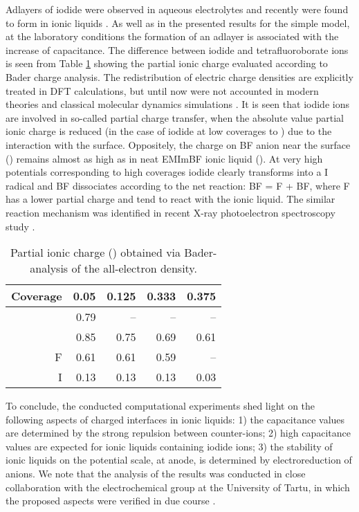 \documentclass[a4paper,10pt]{article}
\begin{document}
Adlayers of iodide were observed in aqueous electrolytes and recently were found to form in ionic liquids \cite{Siinor2013}. As well as in the presented results for the simple model, at the laboratory conditions the formation of an adlayer is associated with the increase of capacitance. The difference between iodide and tetrafluoroborate ions is seen from Table \ref{tab:charges} showing the partial ionic charge evaluated according to Bader charge analysis. The redistribution of electric charge densities are explicitly treated in DFT calculations, but until now were not accounted in modern theories and classical molecular dynamics simulations \cite{dommert2012}. It is seen that iodide ions are involved in so-called partial charge transfer, when the absolute value partial ionic charge is reduced (in the case of iodide at low coverages to ) due to the interaction with the surface. Oppositely, the charge on BF anion near the surface () remains almost as high as in neat EMImBF ionic liquid (). At very high potentials corresponding to high coverages iodide clearly transforms into a I radical and BF dissociates according to the net reaction: BF = F + BF, where F has a lower partial charge and tend to react with the ionic liquid. The similar reaction mechanism was identified in recent X-ray photoelectron spectroscopy study \cite{Tonisoo2013}.

\begin{table}
\begin{center}
\begin{tabular}{ r r r r r }
\hline
Coverage			& 0.05		& 0.125   	& 0.333		& 0.375	\\
\hline
	& 0.79		& --		& --		& --	\\
	& 0.85		& 0.75		& 0.69		& 0.61	\\
F			& 0.61		& 0.61		& 0.59		& --	\\
I			& 0.13		& 0.13		& 0.13		& 0.03	\\
\end{tabular}
\end{center}
  \caption{Partial ionic charge () obtained via Bader-analysis of the all-electron density.}
  \label{tab:charges}
\end{table}



To conclude, the conducted computational experiments shed light on the following aspects of charged interfaces in ionic liquids: 1) the capacitance values are determined by the strong repulsion between counter-ions; 2) high capacitance values are expected for ionic liquids containing iodide ions; 3) the stability of ionic liquids on the potential scale, at anode, is determined by electroreduction of anions. We note that the analysis of the results was conducted in close collaboration with the electrochemical group at the University of Tartu, in which the proposed aspects were verified in due course \cite{Siinor2013,Tonisoo2013}.
\end{document}
